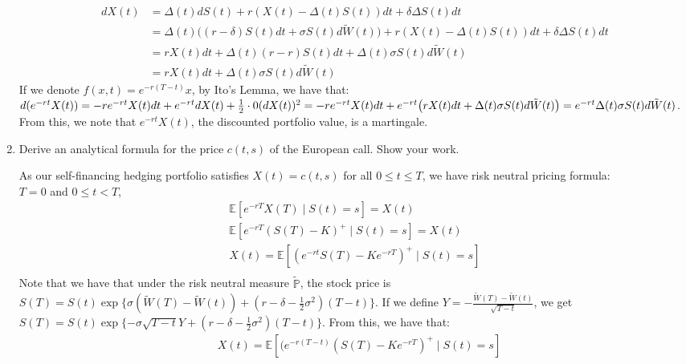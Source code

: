 \documentclass[12pt,twoside, letter]{exam}
\theoremstyle{definition}
\newcommand{\ee}{\mathbb{E}}
\newcommand{\pp}{\mathbb{P}}
\begin{document}
\begin{enumerate}
\begin{solution}
        \begin{align*}
          dX(t) &= \Delta(t)dS(t) + r(X(t) - \Delta(t)S(t))dt + \delta\Delta S(t)dt \\
          &= \Delta(t)\big((r - \delta)S(t) dt + \sigma S(t) d\tilde{W}(t)\big) + r(X(t) - \Delta(t)S(t))dt + \delta\Delta S(t)dt \\
          &= rX(t)dt + \Delta(t)(r - r)S(t)dt + \Delta(t)\sigma S(t)d\tilde{W}(t) \\
          &= rX(t)dt + \Delta(t)\sigma S(t)d\tilde{W}(t)
        \end{align*}
        If we denote $f(x,t) = e^{-r(T-t)}x$, by Ito's Lemma, we have that: \\
        $d(e^{-rt}X(t)) = -re^{-rt}X(t)dt + e^{-rt}dX(t) + \frac{1}{2} \cdot 0 (dX(t))^2 \\
        = -re^{-rt}X(t)dt + e^{-rt}\big(rX(t)dt + \Delta(t)\sigma S(t)d\tilde{W}(t)\big) \\
        = e^{-rt}\Delta(t)\sigma S(t) d\tilde{W}(t)$. \\
        From this, we note that $e^{-rt}X(t)$, the discounted portfolio value, is a martingale.
        \end{solution}
    \item Derive an analytical formula for the price $c(t,s)$ of the European call. Show your work.
      \begin{solution}
        As our self-financing hedging portfolio satisfies $X(t) = c(t,s)$ for all $0 \leq t \leq T$, we have risk neutral
        pricing formula: \\
        $T = 0$ and $0 \leq t < T$, \\
        \begin{align*}
          \ee[e^{-rT}X(T) \mid S(t) = s] = X(t) \\
          \ee[e^{-rT}(S(T) - K)^+ \mid S(t) = s] = X(t) \\
          X(t) = \ee[(e^{-rt}S(T) - Ke^{-rT})^+ \mid S(t) = s] \\
        \end{align*}
        Note that we have that under the risk neutral measure $\tilde{\pp}$, the stock price is $S(T) = S(t)\exp\{ \sigma
        (\tilde{W}(T) - \tilde{W}(t)) + (r - \delta - \frac{1}{2}\sigma^2)(T-t)\}$. If we define $Y = -\frac{\tilde{W}(T) - \tilde{W}(t)}{\sqrt{T-t}}$,
        we get $S(T) = S(t)\exp\{ -\sigma\sqrt{T-t} Y+(r - \delta - \frac{1}{2}\sigma^2)(T-t) \}$. From this, we have that:
        \begin{align*}
          &X(t) = \ee[(e^{-r(T-t)}(S(T) - Ke^{-rT})^+ \mid S(t) = s] \\

\end{align*}
\end{solution}
\end{enumerate}
\end{document}
